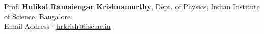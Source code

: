 

\begin{cventries}
\cventry
{}
{}

\begin{cvitems}

  \item{Prof. \textbf{Hulikal Ramaiengar Krishnamurthy},} %
    {Dept. of Physics, Indian Institute of Science, Bangalore.} %
    {} %
    {\\}
    {Email Address - \href{mailto:hrkrish@iisc.ac.in}{hrkrish@iisc.ac.in}} %

\end{cvitems}
\end{cventries}
